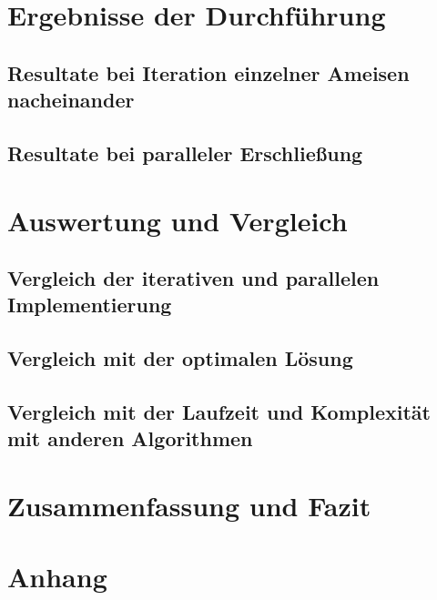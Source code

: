 \documentclass[doktyp=barbeit, sprache=german]{TUBAFarbeiten}
\begin{document}
\section{Ergebnisse der Durchführung}
\subsection{Resultate bei Iteration einzelner Ameisen nacheinander}
\subsection{Resultate bei paralleler Erschließung}
\section{Auswertung und Vergleich}
\subsection{Vergleich der iterativen und parallelen Implementierung}
\subsection{Vergleich mit der optimalen Lösung}
\subsection{Vergleich mit der Laufzeit und Komplexität mit anderen Algorithmen}
\section{Zusammenfassung und Fazit}
\section{Anhang}
\newpage
{}
\end{document}
